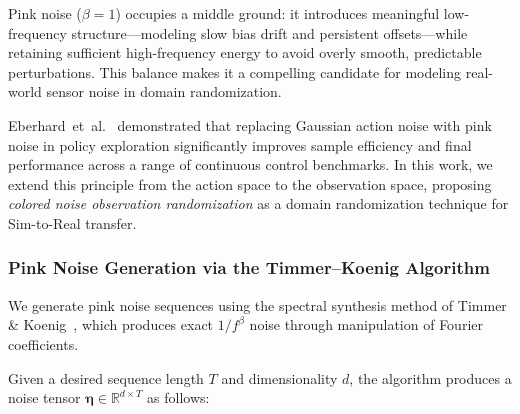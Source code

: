 Pink noise ($\beta = 1$) occupies a middle ground: it introduces meaningful low-frequency structure---modeling slow bias drift and persistent offsets---while retaining sufficient high-frequency energy to avoid overly smooth, predictable perturbations.
This balance makes it a compelling candidate for modeling real-world sensor noise in domain randomization.

Eberhard~et~al.~\cite{eberhard2023pink} demonstrated that replacing Gaussian action noise with pink noise in policy exploration significantly improves sample efficiency and final performance across a range of continuous control benchmarks.
In this work, we extend this principle from the action space to the observation space, proposing \emph{colored noise observation randomization} as a domain randomization technique for Sim-to-Real transfer.

\subsubsection{Pink Noise Generation via the Timmer--Koenig Algorithm}

We generate pink noise sequences using the spectral synthesis method of Timmer \& Koenig~\cite{timmer1995}, which produces exact $1/f^\beta$ noise through manipulation of Fourier coefficients.

Given a desired sequence length $T$ and dimensionality $d$, the algorithm produces a noise tensor $\boldsymbol{\eta} \in \mathbb{R}^{d \times T}$ as follows:

